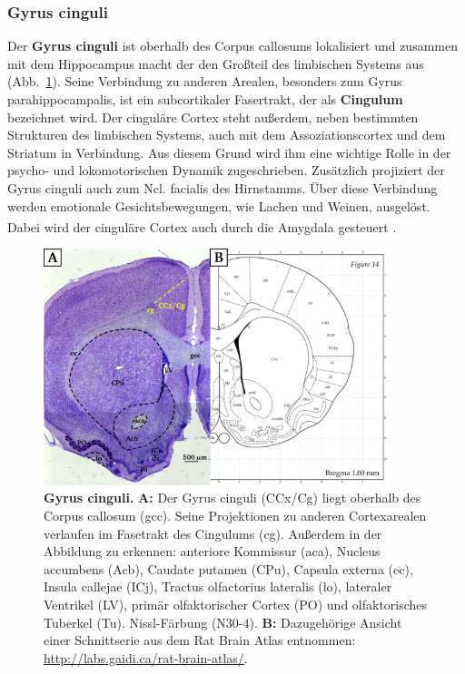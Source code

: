 \documentclass[12pt,a4paper,pdftex]{article}
\begin{document}
\subsubsection*{Gyrus cinguli}  
Der \textbf{Gyrus cinguli} ist oberhalb des Corpus callosums lokalisiert und zusammen mit dem Hippocampus macht der den Großteil des limbischen Systems aus (Abb.~\ref{fig:cingulaerer_Cortex}). Seine Verbindung zu anderen Arealen, besonders zum Gyrus parahippocampalis, ist ein subcortikaler Fasertrakt, der als \textbf{Cingulum} bezeichnet wird. Der cinguläre Cortex steht außerdem, neben bestimmten Strukturen des limbischen Systems, auch mit dem Assoziationscortex und dem Striatum in Verbindung. Aus diesem Grund wird ihm eine wichtige Rolle in der psycho- und lokomotorischen Dynamik zugeschrieben. Zusätzlich projiziert der Gyrus cinguli auch zum Ncl. facialis des Hirnstamms. Über diese Verbindung werden emotionale Gesichtsbewegungen, wie Lachen und Weinen, ausgelöst. Dabei wird der cinguläre Cortex auch durch die Amygdala gesteuert \textsuperscript{\cite[9]{trepel2011neuroanatomie}}.

\begin{figure}[H]
    \centering
    \includegraphics[width=0.9\textwidth]{pictures/Basalganglia/cingulaerer_Cortex.png}
    \caption[Gyrus cinguli]{\textbf{Gyrus cinguli.} \textbf{A:} Der Gyrus cinguli (CCx/Cg) liegt oberhalb des Corpus callosum (gcc). Seine Projektionen zu anderen Cortexarealen verlaufen im Fasetrakt des Cingulums (cg). Außerdem in der Abbildung zu erkennen: anteriore Kommissur (aca), Nucleus accumbens (Acb), Caudate putamen (CPu), Capsula externa (ec), Insula callejae (ICj), Tractus olfactorius lateralis (lo), lateraler Ventrikel (LV), primär olfaktorischer Cortex (PO) und olfaktorisches Tuberkel (Tu). Nissl-Färbung (N30-4). \textbf{B:} Dazugehörige Ansicht einer Schnittserie aus dem Rat Brain Atlas entnommen: \url{http://labs.gaidi.ca/rat-brain-atlas/}.}
    \label{fig:cingulaerer_Cortex}
\end{figure}
\end{document}
